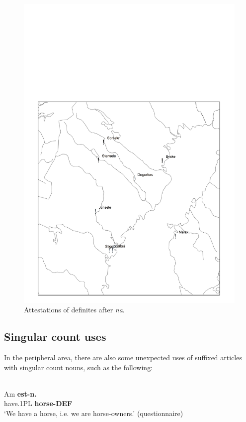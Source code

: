 \begin{figure}[h]
\includegraphics[height=.3\textheight]{figures/17_AttestationsAfterNa}
\caption{Attestations of definites after \textit{na}.}
\label{map:15}

\end{figure}

\subsection{ Singular count uses}
\label{bkm:Ref224379285}

In the peripheral area, there are also some unexpected uses of suffixed articles with singular count nouns, such as the following:

\ea \label{} 
\\
\gll Am  \textbf{est-n.}\\
have.1PL  \textbf{horse-DEF}\\
\glt ‘We have a horse, i.e. we are horse-owners.’ (questionnaire)

